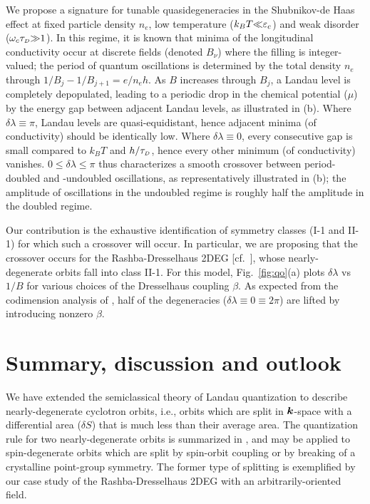 \documentclass[aps, showpacs, twocolumn, notitlepage, superscriptaddress]{revtex4-1}
\begin{document}
We propose a signature for tunable quasidegeneracies in the  Shubnikov-de Haas effect at fixed particle density $n_e$, low temperature ($k_BT{\ll}\varepsilon_c$) and weak disorder ($\omega_c\tau_{\scriptscriptstyle{D}}{\gg}1$).
In this regime, it is known that minima of the longitudinal conductivity occur at discrete fields (denoted $B_{\nu}$)  where the filling is integer-valued\cite{vinter_resolution_1980}; the period of quantum oscillations is determined by the total density $n_e$ through $1/B_j{-}1/B_{j+1}{=}e/n_eh$. As $B$ increases through $B_j$, a Landau level is completely depopulated, leading to a periodic drop in the chemical potential ($\mu$) by the energy gap  between adjacent Landau levels, as illustrated in (b). Where $\delta\lambda{\equiv}\pi$, Landau levels are  quasi-equidistant, hence adjacent minima (of conductivity) should be identically low. Where $\delta\lambda{\equiv}0$, every consecutive gap is small compared to $k_BT$ and $h/\tau_{\scriptscriptstyle{D}}$, hence every other  minimum (of conductivity) vanishes\cite{bychkov_oscillatory_1984}. $0{\leq}\delta\lambda{\leq}{\pi}$ thus characterizes a smooth crossover between period-doubled and -undoubled oscillations, as representatively illustrated in (b); the amplitude of oscillations in the undoubled regime is roughly half the amplitude in the doubled regime.

Our contribution is the exhaustive  identification of symmetry classes (I-1 and II-1) for which such a crossover will occur. In particular, we are proposing that the crossover occurs for the Rashba-Dresselhaus 2DEG [cf.\ ], whose nearly-degenerate orbits fall into class II-1. For this model,  Fig.\ \ref{fig:qo}(a) plots $\delta \lambda$ vs $1/B$ for various choices of the Dresselhaus coupling $\beta$. As expected from the codimension analysis of , half of the degeneracies ($\delta\lambda {\equiv}0{\equiv}2\pi$) are lifted by introducing nonzero $\beta$. 


\section{Summary, discussion and outlook}\label{sec:discussion}

We have extended the semiclassical theory of Landau quantization to describe nearly-degenerate cyclotron orbits, i.e., orbits which are split in $\boldsymbol{k}$-space with a differential area ($\delta S$) that is much less than their average area. The quantization rule for two nearly-degenerate orbits is summarized in , and may be applied to spin-degenerate orbits which are split by spin-orbit coupling or by breaking of a crystalline point-group symmetry. The former type of splitting is exemplified by  our case study of the Rashba-Dresselhaus 2DEG with an arbitrarily-oriented field.
\end{document}
